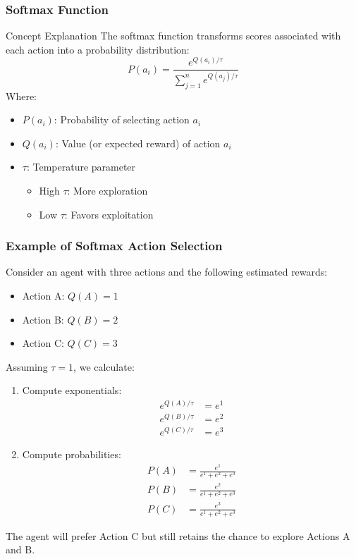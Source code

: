 \documentclass[aspectratio=169]{beamer}
\begin{document}
\begin{frame}[fragile]
    \frametitle{Softmax Function}
    \begin{block}{Concept Explanation}
        The softmax function transforms scores associated with each action into a probability distribution:
        \begin{equation}
            P(a_i) = \frac{e^{Q(a_i) / \tau}}{\sum_{j=1}^n e^{Q(a_j) / \tau}} 
        \end{equation}
        Where:
        \begin{itemize}
            \item \( P(a_i) \): Probability of selecting action \( a_i \)
            \item \( Q(a_i) \): Value (or expected reward) of action \( a_i \)
            \item \( \tau \): Temperature parameter
                \begin{itemize}
                    \item High \( \tau \): More exploration
                    \item Low \( \tau \): Favors exploitation
                \end{itemize}
        \end{itemize}
    \end{block}
\end{frame}

\begin{frame}[fragile]
    \frametitle{Example of Softmax Action Selection}
    Consider an agent with three actions and the following estimated rewards:
    \begin{itemize}
        \item Action A: \( Q(A) = 1 \)
        \item Action B: \( Q(B) = 2 \)
        \item Action C: \( Q(C) = 3 \)
    \end{itemize}
    Assuming \( \tau = 1 \), we calculate:
    \begin{enumerate}
        \item Compute exponentials:
            \begin{align*}
                e^{Q(A)/\tau} &= e^{1} \\
                e^{Q(B)/\tau} &= e^{2} \\
                e^{Q(C)/\tau} &= e^{3}
            \end{align*}
        \item Compute probabilities:
            \begin{align*}
                P(A) &= \frac{e^{1}}{e^{1} + e^{2} + e^{3}} \\
                P(B) &= \frac{e^{2}}{e^{1} + e^{2} + e^{3}} \\
                P(C) &= \frac{e^{3}}{e^{1} + e^{2} + e^{3}}
            \end{align*}
    \end{enumerate}
    The agent will prefer Action C but still retains the chance to explore Actions A and B.
\end{frame}
\end{document}
